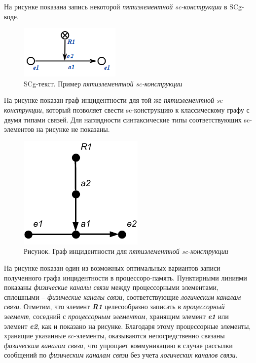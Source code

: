 На рисунке \textit{} показана запись некоторой \textit{пятиэлементной sc-конструкции} в SCg-коде.

\begin{figure}[H]
	\includegraphics[scale=0.8]{images/part6/chapter_computer/computer graph1.png}
	\caption{SCg-текст. Пример \textit{пятиэлементной sc-конструкции}}
	\label{fig:computer-graph1}
\end{figure}

На рисунке \textit{} показан граф инцидентности для той же \textit{пятиэлементной sc-конструкции}, который позволяет свести sc-конструкцию к классическому графу с двумя типами связей. Для наглядности синтаксические типы соответствующих sc-элементов на рисунке не показаны.

\begin{figure}[H]
	\includegraphics[scale=1]{images/part6/chapter_computer/incidence example.pdf}
	\caption{Рисунок. Граф инцидентности для \textit{пятиэлементной sc-конструкции}}
	\label{fig:incidence-example}
\end{figure}

На рисунке \textit{} показан один из возможных оптимальных вариантов записи полученного графа инцидентности в процессоро-память. Пунктирными линиями показаны \textit{физические каналы связи} между процессорными элементами, сплошными -- \textit{физические каналы связи}, соответствующие \textit{логическим каналам связи}. Отметим, что элемент \textbf{\textit{R1}} целесообразно записать в \textit{процессорный элемент}, соседний с \textit{процессорным элементом}, хранящим элемент \textbf{\textit{e1}} или элемент \textbf{\textit{e2}}, как и показано на рисунке. Благодаря этому процессорные элементы, хранящие указанные sc-элементы, оказываются непосредственно связаны \textit{физическим каналом связи}, что упрощает коммуникацию в случае рассылки сообщений по \textit{физическим каналам связи} без учета \textit{логических каналов связи}.

